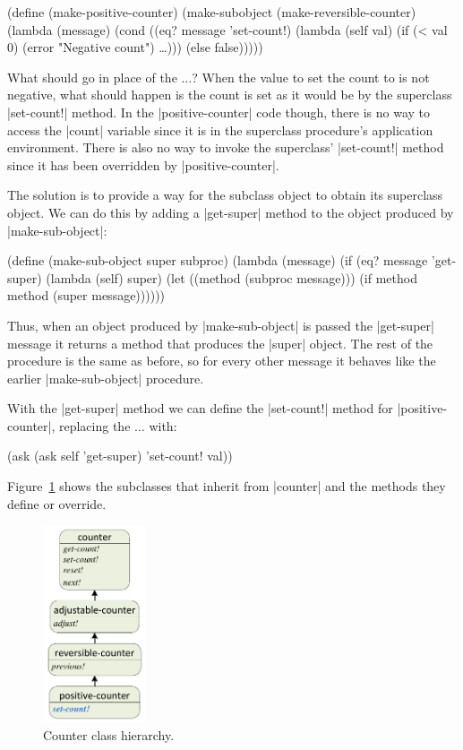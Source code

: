 \begin{schemeregion}
\begin{schemedisplay}
(define (make-positive-counter)
  (make-subobject
   (make-reversible-counter)
   (lambda (message)
     (cond 
      ((eq? message 'set-count!)
       (lambda (self val) (if (< val 0) (error "Negative count") 
                                        \ldots)))
      (else false)))))
\end{schemedisplay}
What should go in place of the $\ldots$?  When the value to set the count to is not negative, what should happen is the count is set as it would be by the superclass \scheme|set-count!| method.  In the \scheme|positive-counter| code though, there is no way to access the \scheme|count| variable since it is in the superclass procedure's application environment.  There is also no way to invoke the superclass' \scheme|set-count!| method since it has been overridden by \scheme|positive-counter|.

The solution is to provide a way for the subclass object to obtain its superclass object.  We can do this by adding a \scheme|get-super| method to the object produced by \scheme|make-sub-object|:
\begin{schemedisplay}
(define (make-sub-object super subproc)
  (lambda (message)
    (if (eq? message 'get-super) 
        (lambda (self) super)
        (let ((method (subproc message)))            
          (if method method (super message))))))
\end{schemedisplay}
Thus, when an object produced by \scheme|make-sub-object| is passed the \scheme|get-super| message it returns a method that produces the \scheme|super| object.  The rest of the procedure is the same as before, so for every other message it behaves like the earlier \scheme|make-sub-object| procedure.

With the \scheme|get-super| method we can define the \scheme|set-count!| method for \scheme|positive-counter|, replacing the $\ldots$ with:
\begin{schemedisplay}
(ask (ask self 'get-super) 'set-count! val))
\end{schemedisplay}

Figure~\ref{fig:counter-hierarchy} shows the subclasses that inherit from \scheme|counter| and the methods they define or override.  

\begin{figure}[bthp]
\begin{center}
\includegraphics[width=1.2in]{figures/counter-hierarchy.pdf}
\caption{Counter class hierarchy.}\label{fig:counter-hierarchy}
\end{center}
\end{figure}


\end{schemeregion}

